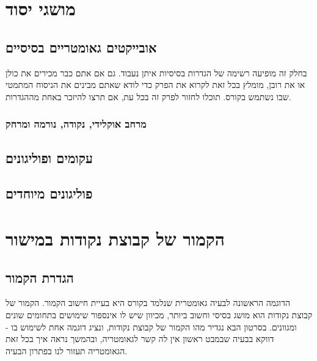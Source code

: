 \documentclass[
]{book}
\begin{document}
\hypertarget{notations}{%
\section{מושגי יסוד}\label{notations}}

\hypertarget{basic-objects}{%
\subsection{אובייקטים גאומטריים בסיסיים}\label{basic-objects}}

בחלק זה מופיעה רשימה של הגדרות בסיסיות איתן נעבוד. גם אם אתם כבר מכירים את כולן או את רובן, מומלץ בכל זאת לקרוא את הפרק כדי לודא שאתם מבינים את הניסוח המתמטי שבו נשתמש בקורס. תוכלו לחזור לפרק זה בכל עת, אם תרצו להיזכר באחת מההגדרות.

\hypertarget{ux5deux5e8ux5d7ux5d1-ux5d0ux5d5ux5e7ux5dcux5d9ux5d3ux5d9-ux5e0ux5e7ux5d5ux5d3ux5d4-ux5e0ux5d5ux5e8ux5deux5d4-ux5d5ux5deux5e8ux5d7ux5e7}{%
\subsubsection*{מרחב אוקלידי, נקודה, נורמה ומרחק}\label{ux5deux5e8ux5d7ux5d1-ux5d0ux5d5ux5e7ux5dcux5d9ux5d3ux5d9-ux5e0ux5e7ux5d5ux5d3ux5d4-ux5e0ux5d5ux5e8ux5deux5d4-ux5d5ux5deux5e8ux5d7ux5e7}}

\hypertarget{curves-polygons}{%
\subsection{עקומים ופוליגונים}\label{curves-polygons}}

\hypertarget{special-polygons}{%
\subsection{פוליגונים מיוחדים}\label{special-polygons}}

\hypertarget{convex-hull}{%
\section{הקמור של קבוצת נקודות במישור}\label{convex-hull}}

\hypertarget{convex-hull-def}{%
\subsection{הגדרת הקמור}\label{convex-hull-def}}

הדוגמה הראשונה לבעיה גאומטרית שנלמד בקורס היא בעיית חישוב הקמור. הקמור של קבוצת נקודות הוא מושג בסיסי וחשוב ביותר, מכיוון שיש לו אינספור שימושים בתחומים שונים ומגוונים. בסרטון הבא נגדיר מהו הקמור של קבוצת נקודות, ונציג דוגמה אחת לשימוש בו - דווקא בבעיה שבמבט ראשון אין לה קשר לגאומטריה, ובהמשך נראה איך בכל זאת הגאומטריה תעזור לנו בפתרון הבעיה.
\end{document}
